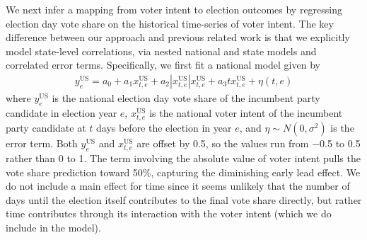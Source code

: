\documentclass[preprint,authoryear,12pt]{elsarticle}
\begin{document}
We next infer a mapping from voter intent to election outcomes
by regressing election day vote share on the historical time-series of voter intent.
The key difference between our approach and previous related work
\citep{erikson2008political,rothschild2009forecasting}
is that we explicitly
model state-level correlations, via nested national and state models and correlated error terms.
Specifically, we first fit a
national model given by
\begin{align*}
  y^{\text{US}}_{e}=a_0+a_1 x^{\text{US}}_{t,e}+
  a_2|x^{\text{US}}_{t,e}|x^{\text{US}}_{t,e} +
  a_3tx^{\text{US}}_{t,e} + \eta(t,e)
\end{align*}
where $y^{\text{US}}_{e}$ is the national election day vote share of the incumbent
party candidate in election year $e$,
$x^{\text{US}}_{t,e}$ is the national voter intent of the incumbent party candidate
at $t$ days before the election in year $e$, and $\eta \sim N(0,\sigma^2)$ is the error term. Both
$y^{\text{US}}_{e}$ and $x^{\text{US}}_{t,e}$ are offset by 0.5, so the values run from $-$0.5 to 0.5 rather than 0 to 1. The term
involving the absolute value of voter intent pulls the vote share prediction
toward 50\%, capturing the diminishing early lead effect. We do not include a
main effect for time since it seems unlikely that the number of days
until the election itself contributes to the final vote share directly, but rather
time contributes through its interaction with the voter intent (which we do include in the model).
\end{document}

